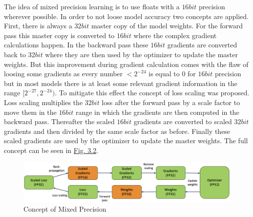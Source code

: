 The idea of mixed precision learning is to use floats with a $16bit$ precision wherever possible. In order to not loose model accuracy two concepts are applied. First, there is always a $32bit$ master copy of the model weights. For the forward pass this master copy is converted to $16bit$ where the complex gradient calculations happen. In the backward pass these $16bit$ gradients are converted back to $32bit$ where they are then used by the optimizer to update the master weights. But this improvement during gradient calculation comes with the flaw of loosing some gradients as every number $<2^{-24}$ is equal to $0$ for $16bit$ precision but in most models there is at least some relevant gradient information in the range $[2^{-27},2^{-24})$. To mitigate this effect the concept of loss scaling was proposed. Loss scaling multiplies the $32bit$ loss after the forward pass by a scale factor to move them in the $16bit$ range in which the gradients are then computed in the backward pass. Thereafter the scaled $16bit$ gradients are converted to scaled $32bit$ gradients and then divided by the same scale factor as before. Finally these scaled gradients are used by the optimizer to update the master weights. The full concept can be seen in \hyperref[fig:3.2]{Fig. 3.2}.
%
\begin{figure}[] \label{fig:3.2}
    \centering
    \includegraphics[width=.9\textwidth]{Chapters/figures/mixed_prec.PNG}
    \caption[Short-form caption]{Concept of Mixed Precision}
\end{figure}
%

